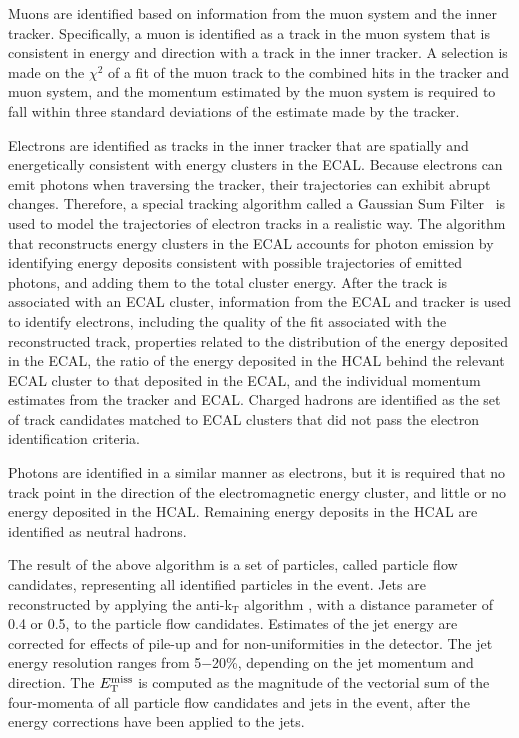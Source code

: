 Muons are identified based on information from the muon system and the inner tracker.  Specifically, a muon is identified as a track in the muon system that is consistent in energy and direction with a track in the inner tracker. A selection is made on the $\chi^2$ of a fit of the muon track to the combined hits in the tracker and muon system, and the momentum estimated by the muon system is required to fall within three standard deviations of the estimate made by the tracker.  

Electrons are identified as tracks in the inner tracker that are spatially and energetically consistent with energy clusters in the ECAL. Because electrons can emit photons when traversing the tracker, their trajectories can exhibit abrupt changes. Therefore, a special tracking algorithm called a Gaussian Sum Filter~\cite{Beaudette:2014cea} is used to model the trajectories of electron tracks in a realistic way. The algorithm that reconstructs energy clusters in the ECAL accounts for photon emission by identifying energy deposits consistent with possible trajectories of emitted photons, and adding them to the total cluster energy.  After the track is associated with an ECAL cluster, information from the ECAL and tracker is used to identify electrons, including the quality of the fit associated with the reconstructed track,  properties related to the distribution of the energy deposited in the ECAL, the ratio of the energy deposited in the HCAL behind the relevant ECAL cluster to that deposited in the ECAL, and the individual momentum estimates from the tracker and ECAL. Charged hadrons are identified as the set of track candidates matched to ECAL clusters that did not pass the electron identification criteria. 

Photons are identified in a similar manner as electrons, but it is required that no track point in the direction of the electromagnetic energy cluster, and little or no energy deposited in the HCAL. Remaining energy deposits in the HCAL are identified as neutral hadrons. 

The result of the above algorithm is a set of particles, called particle flow candidates, representing all identified particles in the event. Jets are reconstructed by applying the anti-k$_{\text{T}}$ algorithm \cite{Cacciari:2008gp}, with a distance parameter of 0.4 or 0.5, to the particle flow candidates. Estimates of the jet energy are corrected for effects of pile-up and for non-uniformities in the detector. The jet energy resolution ranges from 5$-$20\%, depending on the jet momentum and direction. The $E_{\text{T}}^{\rm miss}$ is computed as the magnitude of the vectorial sum of the four-momenta of all particle flow candidates and jets in the event, after the energy corrections have been applied to the jets.

\label{sec:Trigger}



